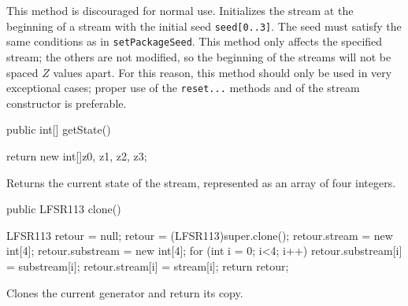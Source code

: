 \begin{tabb} This method is discouraged for normal use.
  Initializes the stream at the beginning of a stream with the initial
  seed \texttt{seed[0..3]}. The seed must satisfy the same conditions
  as in \texttt{setPackageSeed}.
  This method only affects the specified stream; the others are not
  modified, so the beginning of the streams will not be
  spaced $Z$ values apart.
  For this reason, this method should only be used in very
  exceptional cases; proper use of the \texttt{reset...} methods
  and of the stream constructor is preferable.
\end{tabb}
\begin{htmlonly}
\end{htmlonly}
\begin{code}

   public int[] getState() \begin{hide} {
      return new int[]{z0, z1, z2, z3};
   } \end{hide}
\end{code}
\begin{tabb} Returns the current state of the stream, represented as
  an array of four integers.
\end{tabb}
\begin{htmlonly}
\end{htmlonly}
\begin{code}

   public LFSR113 clone() \begin{hide} {
      LFSR113 retour = null;
      retour = (LFSR113)super.clone();
      retour.stream = new int[4];
      retour.substream = new int[4];
      for (int i = 0; i<4; i++) {
         retour.substream[i] = substream[i];
         retour.stream[i] = stream[i];
      }
      return retour;
   }\end{hide}
\end{code}
 \begin{tabb} Clones the current generator and return its copy.
 \end{tabb}
 \begin{htmlonly}
\end{htmlonly}
